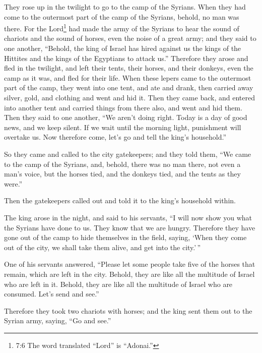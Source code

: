  They rose up in the twilight to go to the camp of the
Syrians. When they had come to the outermost part of the camp of the
Syrians, behold, no man was there.  For the Lord\footnote{7:6
  The word translated ``Lord'' is ``Adonai.''} had made the army of the
Syrians to hear the sound of chariots and the sound of horses, even the
noise of a great army; and they said to one another, ``Behold, the king
of Israel has hired against us the kings of the Hittites and the kings
of the Egyptians to attack us.''  Therefore they arose and
fled in the twilight, and left their tents, their horses, and their
donkeys, even the camp as it was, and fled for their life. 
When these lepers came to the outermost part of the camp, they went into
one tent, and ate and drank, then carried away silver, gold, and
clothing and went and hid it. Then they came back, and entered into
another tent and carried things from there also, and went and hid them.
 Then they said to one another, ``We aren't doing right.
Today is a day of good news, and we keep silent. If we wait until the
morning light, punishment will overtake us. Now therefore come, let's go
and tell the king's household.''

 So they came and called to the city gatekeepers; and they
told them, ``We came to the camp of the Syrians, and, behold, there was
no man there, not even a man's voice, but the horses tied, and the
donkeys tied, and the tents as they were.''

 Then the gatekeepers called out and told it to the king's
household within.

 The king arose in the night, and said to his servants, ``I
will now show you what the Syrians have done to us. They know that we
are hungry. Therefore they have gone out of the camp to hide themselves
in the field, saying, `When they come out of the city, we shall take
them alive, and get into the city.'\,''

 One of his servants answered, ``Please let some people
take five of the horses that remain, which are left in the city. Behold,
they are like all the multitude of Israel who are left in it. Behold,
they are like all the multitude of Israel who are consumed. Let's send
and see.''

 Therefore they took two chariots with horses; and the king
sent them out to the Syrian army, saying, ``Go and see.''


